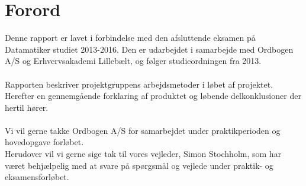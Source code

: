 \section{Forord}
Denne rapport er lavet i forbindelse med den afsluttende eksamen på Datamatiker studiet 2013-2016.
Den er udarbejdet i samarbejde med Ordbogen A/S og Erhvervsakademi Lillebælt, og følger studieordningen fra 2013.
\\\\
Rapporten beskriver projektgruppens arbejdsmetoder i løbet af projektet. Herefter en gennemgående forklaring af produktet og løbende delkonklusioner der hertil hører.
\\\\
Vi vil gerne takke Ordbogen A/S for samarbejdet under praktikperioden og hovedopgave forløbet.
\\
Herudover vil vi gerne sige tak til vores vejleder, Simon Stochholm, som har været behjælpelig med at svare på spørgsmål og vejlede under praktik- og eksamensforløbet.
